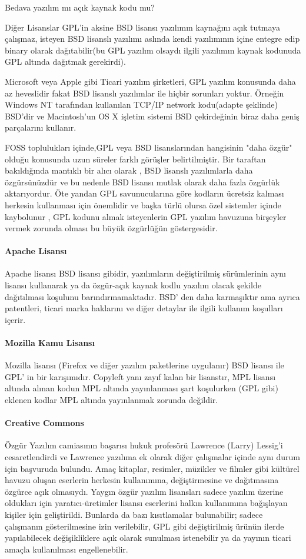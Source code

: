 \documentclass[10pt,a5paper]{book}
\begin{document}
\begin{section}{Bedava yazılım mı açık kaynak kodu mu?}
\begin{subsection}{Diğer Lisanslar}
GPL'in aksine BSD lisansı yazılımın kaynağını açık tutmaya çalışmaz, isteyen  BSD lisanslı yazılımı aslında kendi yazılımının içine entegre edip binary olarak dağıtabilir(bu GPL yazılım olsaydı ilgili yazılımın kaynak kodunuda GPL altında dağıtmak gerekirdi).

Microsoft veya Apple gibi Ticari yazılım şirketleri, GPL yazılım konusunda daha az heveslidir fakat BSD lisanslı yazılımlar  ile hiçbir sorunları yoktur. Örneğin Windows NT tarafından kullanılan TCP/IP   network kodu(adapte şeklinde)  BSD'dir ve Macintosh'un OS X işletim sistemi BSD çekirdeğinin biraz daha geniş parçalarını kullanır.

FOSS toplulukları içinde,GPL veya BSD lisanslarından hangisinin "daha özgür" olduğu konusunda uzun süreler farklı görüşler belirtilmiştir. Bir taraftan bakıldığında mantıklı bir alıcı olarak , BSD lisanslı yazılımlarla daha özgürsünüzdür ve bu nedenle BSD lisansı mutlak olarak daha fazla özgürlük aktarıyordur. Öte yandan GPL savunucularına göre kodların ücretsiz kalması herkesin kullanması için önemlidir ve başka türlü olursa özel sistemler içinde kaybolunur , GPL kodunu almak isteyenlerin GPL yazılım havuzuna birşeyler vermek zorunda olması bu büyük özgürlüğün göstergesidir.

\paragraph{Apache Lisansı}{Apache lisansı BSD lisansı gibidir, yazılımların değiştirilmiş sürümlerinin aynı lisansı kullanarak ya da özgür-açık kaynak kodlu yazılım olacak şekilde dağıtılması koşulunu barındırmamaktadır. BSD' den daha karmaşıktır ama ayrıca patentleri, ticari marka haklarını ve diğer detaylar ile ilgili kullanım koşulları içerir.}
\paragraph{Mozilla Kamu Lisansı}{Mozilla lisansı (Firefox ve diğer yazılım paketlerine uygulanır) BSD lisansı ile GPL' in bir karışımıdır. Copyleft yanı zayıf kalan bir lisanstır, MPL lisansı altında alınan kodun MPL altında yayınlanması şart koşulurken (GPL gibi) eklenen kodlar MPL altında yayınlanmak zorunda değildir.}
\paragraph{Creative Commons}{Özgür Yazılım camiasının başarısı hukuk profesörü Lawrence (Larry) Lessig'i cesaretlendirdi ve Lawrence yazılıma ek olarak diğer çalışmalar içinde aynı durum için başvuruda bulundu. Amaç kitaplar, resimler, müzikler ve filmler gibi kültürel havuzu oluşan eserlerin herkesin kullanımına, değiştirmesine ve dağıtmasına özgürce açık olmasıydı. Yaygın özgür yazılım lisansları sadece yazılım üzerine oldukları için yaratıcı-üretimler lisansı eserlerini halkın kullanımına bağışlayan kişiler için geliştirildi. Bunlarda da bazı kısıtlamalar bulunabilir; sadece çalışmanın gösterilmesine izin verilebilir, GPL gibi değiştirilmiş ürünün ilerde yapılabilecek değişikliklere açık olarak sunulması istenebilir ya da yayının ticari amaçla kullanılması engellenebilir.}

\end{subsection}
\end{section}
\end{document}
